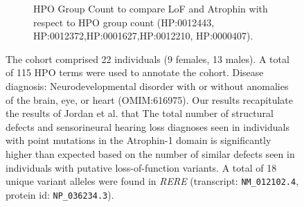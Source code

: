 
\begin{figure}[htbp]\ContinuedFloat
\begin{subfigure}[b]{0.95\textwidth}
\captionsetup{justification=raggedright,singlelinecheck=false}
\caption{HPO Group Count to compare LoF and Atrophin with respect to HPO group count (HP:0012443, HP:0012372,HP:0001627,HP:0012210, HP:0000407).}
\end{subfigure}

\vspace{2em}

\caption{ The cohort comprised 22 individuals (9 females, 13 males). A total of 115 HPO terms were used to annotate the cohort. 
Disease diagnosis: Neurodevelopmental disorder with or without anomalies of the brain, eye, or heart (OMIM:616975). 
Our results recapitulate the results of Jordan et al. \cite{PMID_29330883} that The total number of structural defects and sensorineural hearing loss diagnoses seen in individuals with point mutations in the 
Atrophin-1 domain is significantly higher than expected based on the number of similar defects seen in individuals with putative loss-of-function variants.
A total of 18 unique variant alleles were found in \textit{RERE} (transcript: \texttt{NM\_012102.4}, protein id: \texttt{NP\_036234.3}).}
\end{figure}

